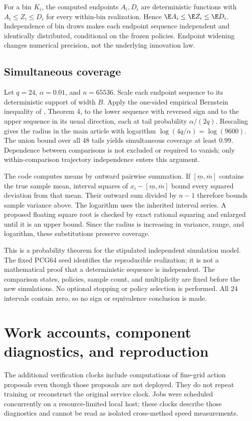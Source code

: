 \documentclass[ecta,nameyear,draft]{econsocart}
\begin{document}
For a bin $K_i$, the computed endpoints $A_i,D_i$ are deterministic functions with $A_i\leq Z_i\leq D_i$ for every within-bin realization. Hence $\E A_i\leq\E Z_i\leq\E D_i$. Independence of bin draws makes each endpoint sequence independent and identically distributed, conditional on the frozen policies. Endpoint widening changes numerical precision, not the underlying innovation law.

\subsection{Simultaneous coverage}
Let $q=24$, $\alpha=0.01$, and $n=65536$. Scale each endpoint sequence to its deterministic support of width $B$. Apply the one-sided empirical Bernstein inequality of \citet{maurer2009}, Theorem 4, to the lower sequence with reversed sign and to the upper sequence in its usual direction, each at tail probability $\alpha/(2q)$. Rescaling gives the radius in the main article with logarithm $\log(4q/\alpha)=\log(9600)$. The union bound over all 48 tails yields simultaneous coverage at least $0.99$. Dependence between comparisons is not excluded or required to vanish; only within-comparison trajectory independence enters this argument.

The code computes means by outward pairwise summation. If $[\underline m,\overline m]$ contains the true sample mean, interval squares of $x_i-[\underline m,\overline m]$ bound every squared deviation from that mean. Their outward sum divided by $n-1$ therefore bounds sample variance above. The logarithm uses the inherited interval series. A proposed floating square root is checked by exact rational squaring and enlarged until it is an upper bound. Since the radius is increasing in variance, range, and logarithm, these substitutions preserve coverage.

This is a probability theorem for the stipulated independent simulation model. The fixed PCG64 seed identifies the reproducible realization; it is not a mathematical proof that a deterministic sequence is independent. The comparison states, policies, sample count, and multiplicity are fixed before the new simulations. No optional stopping or policy selection is performed. All 24 intervals contain zero, so no sign or equivalence conclusion is made.



\section{Work accounts, component diagnostics, and reproduction}

The additional verification clocks include computations of fine-grid action proposals even though those proposals are not deployed. They do not repeat training or reconstruct the original service clock. Jobs were scheduled concurrently on a resource-limited local host; these clocks describe those diagnostics and cannot be read as isolated cross-method speed measurements.
\end{document}
